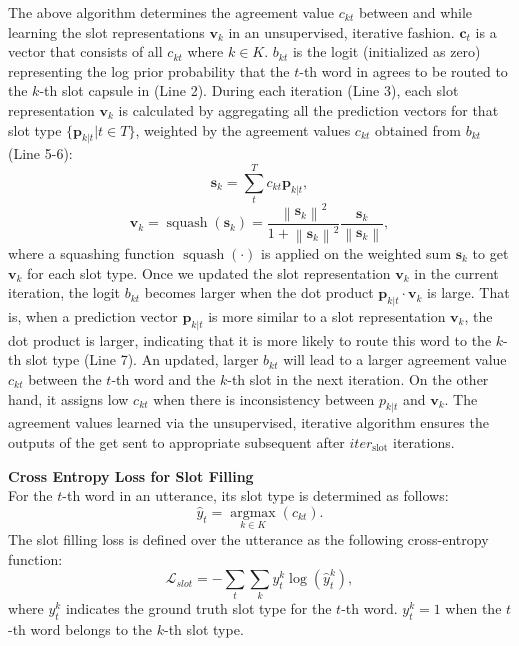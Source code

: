 The above algorithm determines the agreement value $c_{kt}$ between {\FirstCapsule} and {\SecondCapsule} while learning the slot representations $\mathbf{v}_k$ in an unsupervised, iterative fashion. $\mathbf{c}_t$ is a vector that consists of all $c_{kt}$ where $k\in{K}$.
${b}_{kt}$ is the logit (initialized as zero) representing the log prior probability that the $t$-th word in {\FirstCapsule} agrees to be routed to the $k$-th slot capsule in {\SecondCapsule} (Line 2). During each iteration (Line 3), each slot representation $\mathbf{v}_k$ is calculated by aggregating all the prediction vectors for that slot type $\{{\mathbf{p}_{k|t}} | t{\in}T\}$, weighted by the agreement values $c_{kt}$ obtained from $b_{kt}$ (Line 5-6):
\begin{equation}
    \mathbf{s}_{k} = \sum_{t}^{T}c_{kt}\mathbf{p}_{k|t},
\end{equation}
\begin{equation}
    \mathbf{v}_{k} = \operatorname{squash}(\mathbf{s}_{k}) = \frac{\left \| \mathbf{s}_{k} \right \|^{2}}{1 + \left \| \mathbf{s}_{k}\right \|^{2} }\frac{\mathbf{s}_{k}}{\left \| \mathbf{s}_{k} \right \|},
\end{equation}
where a squashing function $\operatorname{squash}(\cdot)$ is applied on the weighted sum \(\mathbf{s}_{k}\) to get \(\mathbf{v}_{k}\) for each slot type.
Once we updated the slot representation $\mathbf{v}_k$ in the current iteration, the logit $b_{kt}$ becomes larger when the dot product $\mathbf{p}_{k|t}\cdot\mathbf{v}_{k}$ is large. That is, when a prediction vector $\mathbf{p}_{k|t}$ is more similar to a slot representation $\mathbf{v}_k$, the dot product is larger, indicating that it is more likely to route this word to the $k$-th slot type (Line 7). An updated, larger $b_{kt}$ will lead to a larger agreement value $c_{kt}$ between the $t$-th word and the $k$-th slot in the next iteration.
On the other hand, it assigns low $c_{kt}$ when there is inconsistency between $p_{k|t} $ and $\mathbf{v}_k$.
The agreement values learned via the unsupervised, iterative algorithm ensures the outputs of the {\FirstCapsule} get sent to appropriate subsequent {\SecondCapsule} after $iter_{\operatorname{slot}}$ iterations.

\noindent\textbf{Cross Entropy Loss for Slot Filling}\\
For the $t$-th word in an utterance, its slot type is determined as follows:
\begin{equation}
{\hat y}_t = \mathop {\arg \max }\limits_{k \in K} ({{c}_{kt}}).
\end{equation}
The slot filling loss is defined over the utterance as the following cross-entropy function:
\begin{equation}
\mathcal{L}_{slot} = - \sum\limits_t {\sum\limits_k {y_t^k\log (\hat y_t^k)} },
\end{equation}
where $y_t^k$ indicates the ground truth slot type for the $t$-th word. $y_t^k=1$ when the $t$-th word belongs to the $k$-th slot type.

